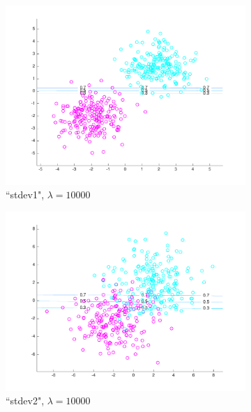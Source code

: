 \begin{figure}[h!]
    \begin{subfigure}[b]{0.22\textwidth}
	\includegraphics[scale=0.25]{hw2_1_stdev1_a_10000.pdf}
	\caption{``stdev1", $\lambda = 10000$}
    \end{subfigure}
    \quad
    \begin{subfigure}[b]{0.22\textwidth}
	\includegraphics[scale=0.25]{hw2_1_stdev2_a_10000.pdf}
	\caption{``stdev2", $\lambda = 10000$}
	\end{subfigure}
	\quad	    
    \begin{subfigure}[b]{0.22\textwidth}

\end{subfigure}
\end{figure}
